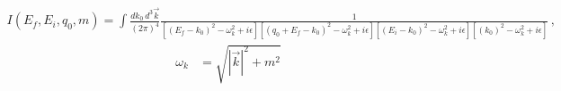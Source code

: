\begin{align}
I(E_f, E_i, q_0, m) = \int \frac{d k_0 \, d^3 \vec{k}}{(2\pi)^4}
\frac{1}{
\left[(E_f - k_0)^2 - \omega_k^2 + i\epsilon\right]
\left[(q_0 + E_f - k_0)^2 - \omega_k^2 + i\epsilon\right]
\left[(E_i - k_0)^2 - \omega_k^2 + i\epsilon\right]
\left[(k_0)^2 - \omega_k^2 + i\epsilon\right]
}\,,
\end{align}
\begin{align}
\omega_k &= \sqrt{|\vec{k}|^2+m^2}
\end{align}